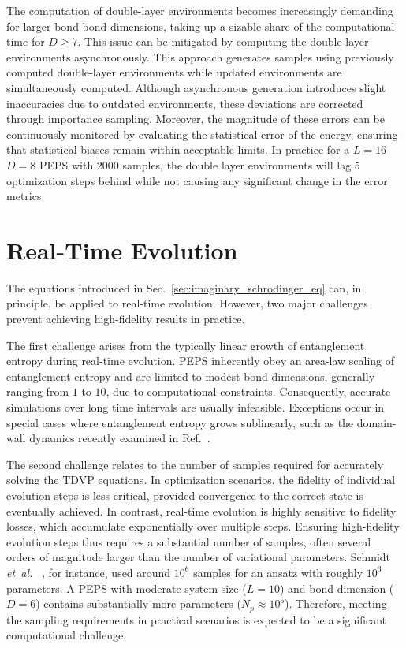 \documentclass[aps,notitlepage,twocolumn,nofootinbib,superscriptaddress,pra,10pt]{revtex4-2}
\newcommand{\etal}{\textit{et~al.} }
\begin{document}
The computation of double-layer environments becomes increasingly demanding for larger bond bond dimensions, taking up a sizable share of the computational time for $D\ge7$.
This issue can be mitigated by computing the double-layer environments asynchronously. This approach generates samples using previously computed double-layer environments while updated environments are simultaneously computed. Although asynchronous generation introduces slight inaccuracies due to outdated environments, these deviations are corrected through importance sampling. Moreover, the magnitude of these errors can be continuously monitored by evaluating the statistical error of the energy, ensuring that statistical biases remain within acceptable limits. In practice for a $L=16$ $D=8$ PEPS with $2000$ samples, the double layer environments will lag 5 optimization steps behind while not causing any significant change in the error metrics.

\section{Real-Time Evolution}
\label{app:real_time_evo}
The equations introduced in Sec.~\ref{sec:imaginary_schrodinger_eq} can, in principle, be applied to real-time evolution. However, two major challenges prevent achieving high-fidelity results in practice.

The first challenge arises from the typically linear growth of entanglement entropy during real-time evolution. PEPS inherently obey an area-law scaling of entanglement entropy and are limited to modest bond dimensions, generally ranging from $1$ to $10$, due to computational constraints. Consequently, accurate simulations over long time intervals are usually infeasible. Exceptions occur in special cases where entanglement entropy grows sublinearly, such as the domain-wall dynamics recently examined in Ref.~\cite{krinitsin2024_rougheningdynamicsinterfacestwodimensional}.

The second challenge relates to the number of samples required for accurately solving the TDVP equations. In optimization scenarios, the fidelity of individual evolution steps is less critical, provided convergence to the correct state is eventually achieved. In contrast, real-time evolution is highly sensitive to fidelity losses, which accumulate exponentially over multiple steps. Ensuring high-fidelity evolution steps thus requires a substantial number of samples, often several orders of magnitude larger than the number of variational parameters. Schmidt \etal~\cite{schmitt2020quantum}, for instance, used around $10^6$ samples for an ansatz with roughly $10^3$ parameters. A PEPS with moderate system size ($L = 10$) and bond dimension ($D = 6$) contains substantially more parameters ($N_p\approx10^5$). Therefore, meeting the sampling requirements in practical scenarios is expected to be a significant computational challenge.
\end{document}
